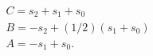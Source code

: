 \begin{equation}
\begin{array}{l}
    C=s_2+s_1+s_0 \\
    B=-s_2+(1/2)(s_1+s_0) \\
    A=-s_1+s_0.
  \end{array}
\end{equation}


